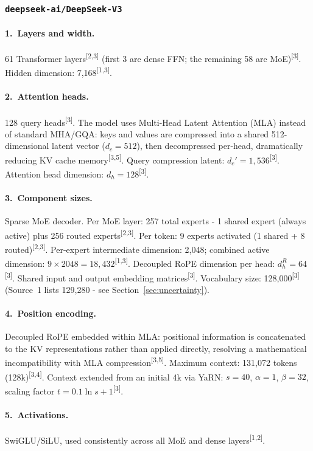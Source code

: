 \documentclass[11pt, a4paper]{article}
\newcommand{\src}[1]{\textsuperscript{\normalfont\small[#1]}}
\begin{document}
\subsubsection{\texttt{deepseek-ai/DeepSeek-V3}}

\paragraph{1.~Layers and width.}
61 Transformer layers\src{2,3} (first 3 are dense FFN; the remaining 58 are
MoE)\src{3}.
Hidden dimension: 7,168\src{1,3}.

\paragraph{2.~Attention heads.}
128 query heads\src{3}.
The model uses Multi-Head Latent Attention (MLA) instead of standard MHA/GQA:
keys and values are compressed into a shared 512-dimensional latent vector
($d_c=512$), then decompressed per-head, dramatically reducing KV cache
memory\src{3,5}.
Query compression latent: $d_c'=1{,}536$\src{3}.
Attention head dimension: $d_h=128$\src{3}.

\paragraph{3.~Component sizes.}
Sparse MoE decoder.
Per MoE layer: 257 total experts - 1 shared expert (always active) plus 256
routed experts\src{2,3}.
Per token: 9 experts activated (1 shared + 8 routed)\src{2,3}.
Per-expert intermediate dimension: 2,048; combined active dimension:
$9\times2048=18{,}432$\src{1,3}.
Decoupled RoPE dimension per head: $d_h^R=64$\src{3}.
Shared input and output embedding matrices\src{3}.
Vocabulary size: 128,000\src{3} (Source~1 lists 129,280 - see
Section~\ref{sec:uncertainty}).

\paragraph{4.~Position encoding.}
Decoupled RoPE embedded within MLA: positional information is concatenated
to the KV representations rather than applied directly, resolving a mathematical
incompatibility with MLA compression\src{3,5}.
Maximum context: 131,072 tokens (128k)\src{3,4}.
Context extended from an initial 4k via YaRN: $s=40$, $\alpha=1$, $\beta=32$,
scaling factor $t=0.1\ln s+1$\src{3}.

\paragraph{5.~Activations.}
SwiGLU/SiLU, used consistently across all MoE and dense layers\src{1,2}.
\end{document}
